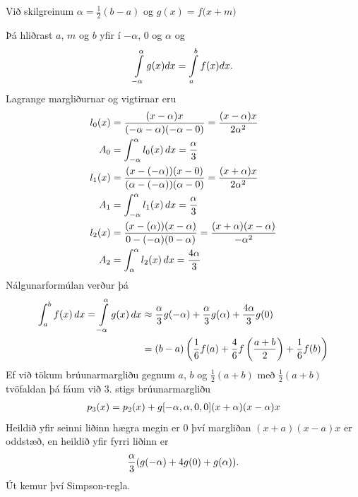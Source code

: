 \documentclass[letterpaper,10pt,icelandic]{sphinxmanual}
\begin{document}
Við skilgreinum \(\alpha=\tfrac 12(b-a)\) og
\(g(x) = f\big(x+m\big)\)

Þá hliðrast \(a\), \(m\) og \(b\) yfir í \(-\alpha\),
\(0\) og \(\alpha\) og
\begin{gather}
\begin{split}\int\limits_{-\alpha}^{\alpha} g(x) dx =
  \int\limits_a^b f(x) dx.\end{split}\notag
\end{gather}
Lagrange margliðurnar og vigtirnar eru
\begin{gather}
\begin{split}\begin{aligned}
  l_0(x) &= \frac{(x-\alpha)x}{(-\alpha-\alpha)(-\alpha - 0)}
  = \frac{(x-\alpha)x}{2\alpha^2} \\
  A_0 &= \int_{-\alpha}^{\alpha} l_0(x)\,dx = \frac{\alpha}{3} \\
  l_1(x) &= \frac{(x-(-\alpha))(x-0)}{(\alpha - ( -\alpha))(\alpha - 0)}
  = \frac{(x+\alpha)x}{2\alpha^2}\\
  A_1 &= \int_{-\alpha}^{\alpha} l_1(x)\,dx = \frac{\alpha}{3}\\
  l_2(x) &= \frac{(x-(\alpha))(x-\alpha)}{0-(-\alpha)(0-\alpha)}
  = \frac{(x+\alpha)(x-\alpha)}{-\alpha^2}\\
  A_2 &= \int_{\alpha}^{\alpha} l_2(x)\,dx = \frac{4\alpha}{3}\end{aligned}\end{split}\notag
\end{gather}
Nálgunarformúlan verður þá
\begin{gather}
\begin{split}\begin{aligned}
  \int_a^b f(x) \, dx = \int\limits_{-\alpha}^{\alpha} g(x) \, dx
  &\approx \frac{\alpha}{3}g(-\alpha) + \frac{\alpha}{3}g(\alpha)
  + \frac{4\alpha}{3}g(0)\\
  &=(b-a)\left( \frac{1}{6}f(a) + \frac{4}{6}f
    \left( \frac{a+b}{2}\right) + \frac{1}{6} f(b)  \right)\end{aligned}\end{split}\notag
\end{gather}
Ef við tökum brúunarmargliðu gegnum \(a\), \(b\) og
\(\frac{1}{2}(a+b)\) með \(\frac{1}{2}(a+b)\) tvöfaldan þá fáum
við 3. stigs brúunarmargliðu
\begin{gather}
\begin{split}p_3(x) = p_2(x) + g[-\alpha, \alpha, 0, 0](x+\alpha)(x-\alpha)x\end{split}\notag
\end{gather}
Heildið yfir seinni liðinn hægra megin er 0 því margliðan
\((x+a)(x-a)x\) er oddstæð, en heildið yfir fyrri liðinn er
\begin{gather}
\begin{split}\frac \alpha3(g(-\alpha) + 4g(0) + g(\alpha)).\end{split}\notag
\end{gather}
Út kemur því Simpson-regla.
\end{document}
